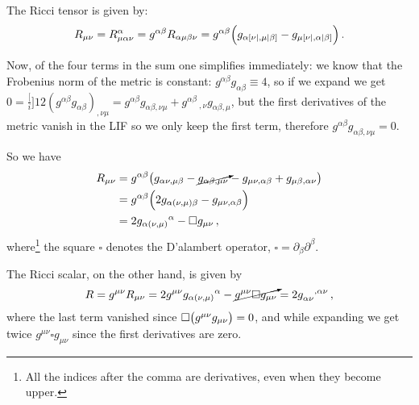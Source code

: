 \documentclass[main.tex]{subfiles}
\begin{document}
The Ricci tensor is given by: 
%
\begin{equation}
  R_{\mu \nu } = R^{\alpha }_{\mu \alpha \nu } 
  = g^{\alpha \beta }R_{\alpha \mu \beta \nu }
  = g^{\alpha \beta }\qty(g_{\alpha [\nu|, \mu | \beta ]} - g_{\mu [\nu|, \alpha | \beta ]})
\,.
\end{equation}
%

Now, of the four terms in the sum one simplifies immediately: we know that the Frobenius norm of the metric is constant: \(g^{\alpha \beta }g_{\alpha \beta } \equiv 4\), so if we expand we get \(0=\frac[i]{1}{2} (g^{\alpha \beta }g_{\alpha \beta })_{,\nu \mu } = g^{\alpha \beta }g_{\alpha \beta , \nu \mu } + g^{\alpha \beta }\,_{,\nu }g_{\alpha \beta , \mu }\), but the first derivatives of the metric vanish in the LIF so we only keep the first term, therefore \(g^{\alpha \beta }g_{\alpha \beta , \nu \mu }=0\).

So we have 
%
\begin{subequations}
    \begin{align}
    R_{\mu \nu }
    &= g^{\alpha \beta }\qty(
      g_{\alpha \nu , \mu \beta }
      -\cancelto{}{g_{\alpha \beta , \mu \nu }}
      - g_{\mu \nu , \alpha \beta }
      + g_{\mu \beta , \alpha \nu }
    )  \\
    &=g^{\alpha \beta }\qty(
      2 g_{\alpha (\nu , \mu ) \beta }
      - g_{\mu \nu , \alpha \beta }
    )  \\
    &= 2 g_{\alpha (\nu , \mu )}\,\!^{\alpha } - \square g_{\mu \nu } \label{eq:Ricci-tensor-LIF}
\,,
\end{align}
\end{subequations}
%
where\footnote{All the indices after the comma are derivatives, even when they become upper.} the square \(\square\) denotes the D'alambert operator, \(\square = \partial_{\beta }\partial^{\beta }\).

The Ricci scalar, on the other hand, is given by 
%
\begin{equation} \label{eq:ricci-scalar-LIF} 
  R = g^{\mu \nu }R_{\mu \nu }
  = 2 g^{\mu \nu }g_{\alpha (\nu , \mu )}\,\!^{\alpha } - \cancelto{}{g^{\mu \nu }\square g_{\mu \nu }}
  = 2 \tensor{g}{_{\alpha \nu }^{, \alpha \nu }}
\,,
\end{equation}
%
where the last term vanished since \(\square \qty(g^{\mu \nu }g_{\mu \nu })=0\), and while expanding we get twice \(g^{\mu \nu }\square g_{\mu \nu }\) since the first derivatives are zero.
\end{document}
